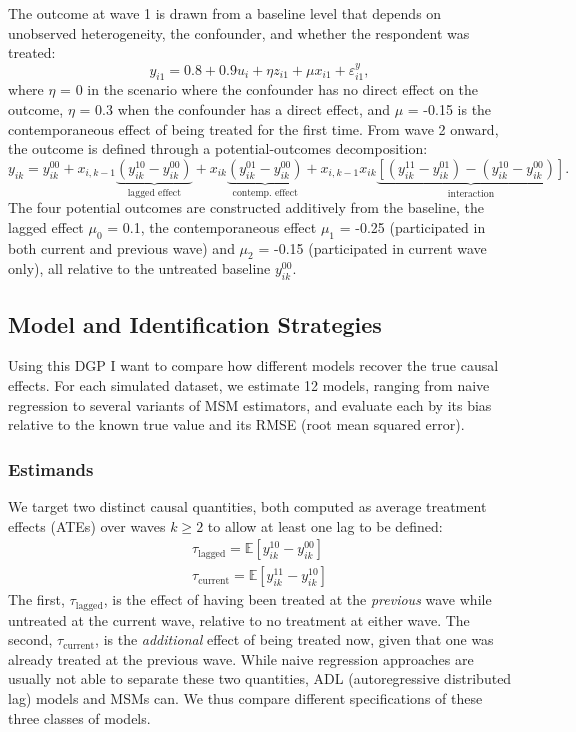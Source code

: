 \documentclass[
  letterpaper,
  DIV=11,
  numbers=noendperiod]{scrartcl}
\begin{document}
The outcome at wave 1 is drawn from a baseline level that depends on
unobserved heterogeneity, the confounder, and whether the respondent was
treated:
\[ y_{i1} = 0.8 + 0.9u_i + \eta z_{i1} + \mu x_{i1} + \varepsilon_{i1}^y, \]
where \(\eta\) = 0 in the scenario where the confounder has no direct
effect on the outcome, \(\eta\) = 0.3 when the confounder has a direct
effect, and \(\mu\) = -0.15 is the contemporaneous effect of being
treated for the first time. From wave 2 onward, the outcome is defined
through a potential-outcomes decomposition: \[ 
y_{ik} = y_{ik}^{00} + x_{i,k-1}\underbrace{(y_{ik}^{10}-y_{ik}^{00})}_{\text{lagged effect}} + 
x_{ik}\underbrace{(y_{ik}^{01}-y_{ik}^{00})}_{\text{contemp. effect}} +
x_{i,k-1}x_{ik}\underbrace{[(y_{ik}^{11}-y_{ik}^{01})-(y_{ik}^{10}-y_{ik}^{00})]}_{\text{interaction}}.
\] The four potential outcomes are constructed additively from the
baseline, the lagged effect \(\mu_0\) = 0.1, the contemporaneous effect
\(\mu_1\) = -0.25 (participated in both current and previous wave) and
\(\mu_2\) = -0.15 (participated in current wave only), all relative to
the untreated baseline \(y_{ik}^{00}.\)

\subsection{Model and Identification
Strategies}\label{model-and-identification-strategies}

Using this DGP I want to compare how different models recover the true
causal effects. For each simulated dataset, we estimate 12 models,
ranging from naive regression to several variants of MSM estimators, and
evaluate each by its bias relative to the known true value and its RMSE
(root mean squared error).

\subsubsection{Estimands}\label{estimands}

We target two distinct causal quantities, both computed as average
treatment effects (ATEs) over waves \(k \geq 2\) to allow at least one
lag to be defined:
\begin{align*}
\tau_{\text{lagged}} = \mathbb{E}[y_{ik}^{10}-y_{ik}^{00}] \\
\tau_{\text{current}} = \mathbb{E}[y_{ik}^{11}-y_{ik}^{10}]
\end{align*}
The first, \(\tau_{\text{lagged}}\), is the effect of having been
treated at the \emph{previous} wave while untreated at the current wave,
relative to no treatment at either wave. The second,
\(\tau_{\text{current}}\), is the \emph{additional} effect of being
treated now, given that one was already treated at the previous wave.
While naive regression approaches are usually not able to separate these
two quantities, ADL (autoregressive distributed lag) models and MSMs
can. We thus compare different specifications of these three classes of
models.
\end{document}
